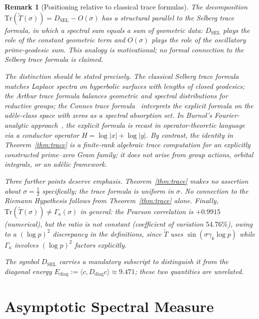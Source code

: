 \documentclass[11pt]{article}
\newtheorem*{remark}{Remark}
\newcommand{\Tt}{\widetilde{T}}
\newcommand{\DSEL}{D_{\mathrm{SEL}}}
\newcommand{\Ediag}{E_{\mathrm{diag}}}
\begin{document}
\begin{remark}[Positioning relative to classical trace formulas]
The decomposition $\mathrm{Tr}(\Tt(\sigma))=\DSEL-O(\sigma)$
has a structural parallel to the Selberg trace formula,
in which a spectral sum equals a sum of geometric data:
$\DSEL$ plays the role of the constant geometric term and
$O(\sigma)$ plays the role of the oscillatory prime-geodesic sum.
This analogy is motivational; no formal connection to the
Selberg trace formula is claimed.

The distinction should be stated precisely.
The classical Selberg trace formula matches Laplace spectra on
hyperbolic surfaces with lengths of closed geodesics; the Arthur
trace formula balances geometric and spectral distributions for
reductive groups; the Connes trace formula~\cite{Connes}
interprets the explicit formula on the ad\`ele-class space with
zeros as a spectral absorption set.
In Burnol's Fourier-analytic approach~\cite{Burnol}, the explicit
formula is recast in operator-theoretic language via a conductor
operator $H=\log|x|+\log|y|$.
By contrast, the identity in Theorem~\ref{thm:trace} is a
finite-rank algebraic trace computation for an explicitly
constructed prime--zero Gram family; it does not arise from
group actions, orbital integrals, or an ad\`elic framework.

Three further points deserve emphasis.
Theorem~\ref{thm:trace} makes no assertion about $\sigma=\tfrac{1}{2}$
specifically; the trace formula is uniform in $\sigma$.
No connection to the Riemann Hypothesis follows from
Theorem~\ref{thm:trace} alone.
Finally, $\mathrm{Tr}(\Tt(\sigma))\neq\Gamma_\kappa(\sigma)$ in general:
the Pearson correlation is $+0.9915$ (numerical), but the ratio is not
constant (coefficient of variation $54.76\%$), owing to a $(\log p)^2$
discrepancy in the definitions, since $\Tt$ uses $\sin(\sigma\gamma_k\log p)$
while $\Gamma_\kappa$ involves $(\log p)^2$ factors explicitly.

The symbol $\DSEL$ carries a mandatory subscript to distinguish it
from the diagonal energy $\Ediag := \langle c,D_{\mathrm{diag}}c\rangle
\approx 9.471$; these two quantities are unrelated.
\end{remark}

\section{Asymptotic Spectral Measure}
\label{sec:asymp}
\end{document}
